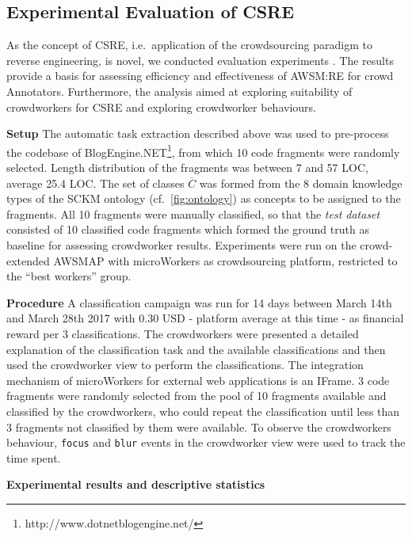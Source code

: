 \hypertarget{sec:csre.experiment}{%
\subsection{Experimental Evaluation of CSRE}\label{sec:csre.experiment}}

As the concept of CSRE, i.e.~application of the crowdsourcing paradigm to reverse engineering, is novel, we conducted evaluation experiments \autocite{Heil2019CSRECCIS}.
The results provide a basis for assessing efficiency and effectiveness of AWSM:RE for crowd Annotators.
Furthermore, the analysis aimed at exploring suitability of crowdworkers for CSRE and exploring crowdworker behaviours.

\textbf{Setup} The automatic task extraction described above was used to pre-process the codebase of BlogEngine.NET\footnote{http://www.dotnetblogengine.net/}, from which 10 code fragments were randomly selected.
Length distribution of the fragments was between 7 and 57 LOC, average 25.4 LOC.
The set of classes \(\overline C\) was formed from the 8 domain knowledge types of the SCKM ontology (cf.~\cref{fig:ontology}) as concepts to be assigned to the fragments.
All 10 fragments were manually classified, so that the \emph{test dataset} consisted of 10 classified code fragments which formed the ground truth as baseline for assessing crowdworker results.
Experiments were run on the crowd-extended AWSMAP with microWorkers as crowdsourcing platform, restricted to the ``best workers'' group.

\textbf{Procedure} A classification campaign was run for 14 days between March 14th and March 28th 2017 with 0.30 USD - platform average at this time - as financial reward per 3 classifications.
The crowdworkers were presented a detailed explanation of the classification task and the available classifications and then used the crowdworker view to perform the classifications.
The integration mechanism of microWorkers for external web applications is an IFrame.
3 code fragments were randomly selected from the pool of 10 fragments available and classified by the crowdworkers, who could repeat the classification until less than 3 fragments not classified by them were available.
To observe the crowdworkers behaviour, \texttt{focus} and \texttt{blur} events in the crowdworker view were used to track the time spent.

\textbf{Experimental results and descriptive statistics}


